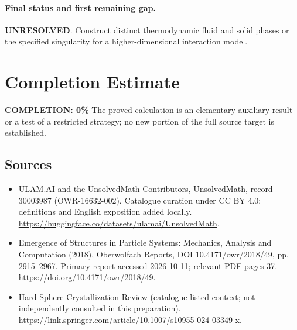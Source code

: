 \documentclass[11pt]{article}
\begin{document}
\paragraph{Final status and first remaining gap.}
\textbf{UNRESOLVED}. Construct distinct thermodynamic fluid and solid phases or the specified singularity for a higher-dimensional interaction model.

\section{Completion Estimate}
\noindent\textbf{COMPLETION: 0\%}
The proved calculation is an elementary auxiliary result or a test of a restricted strategy; no new portion of the full source target is established.

\subsection{Sources}
\begin{itemize}
\item[\hypertarget{source:30003987:1}{S1}] ULAM.AI and the UnsolvedMath Contributors, UnsolvedMath, record 30003987 (OWR-16632-002). Catalogue curation under CC BY 4.0; definitions and English exposition added locally.
\url{https://huggingface.co/datasets/ulamai/UnsolvedMath}.
\item[\hypertarget{source:30003987:2}{S2}] Emergence of Structures in Particle Systems: Mechanics, Analysis and Computation (2018), Oberwolfach Reports, DOI 10.4171/owr/2018/49, pp. 2915--2967. Primary report accessed 2026-10-11; relevant PDF pages 37.
\url{https://doi.org/10.4171/owr/2018/49}.
\item[\hypertarget{source:30003987:3}{S3}] Hard-Sphere Crystallization Review (catalogue-listed context; not independently consulted in this preparation).
\url{https://link.springer.com/article/10.1007/s10955-024-03349-x}.
\end{itemize}
\label{end:30003987}
\end{document}
